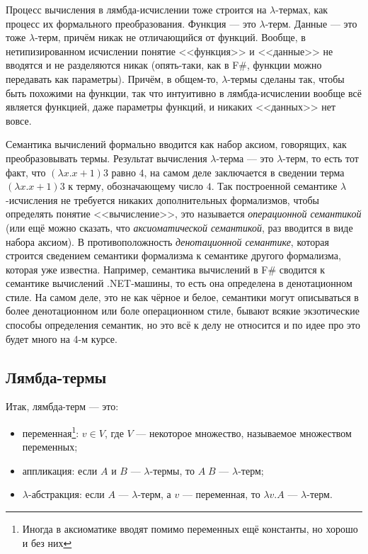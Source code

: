\documentclass{../../text-style}
\begin{document}
Процесс вычисления в лямбда-исчислении тоже строится на $\lambda$-термах, как процесс их формального преобразования. Функция --- это $\lambda$-терм. Данные --- это тоже $\lambda$-терм, причём никак не отличающийся от функций. Вообще, в нетипизированном исчислении понятие <<функция>> и <<данные>> не вводятся и не разделяются никак (опять-таки, как в F\#, функции можно передавать как параметры). Причём, в общем-то, $\lambda$-термы сделаны так, чтобы быть похожими на функции, так что интуитивно в лямбда-исчислении вообще всё является функцией, даже параметры функций, и никаких <<данных>> нет вовсе.

Семантика вычислений формально вводится как набор аксиом, говорящих, как преобразовывать термы. Результат вычисления $\lambda$-терма --- это $\lambda$-терм, то есть тот факт, что $(\lambda x.x + 1) 3$ равно $4$, на самом деле заключается в сведении терма $(\lambda x.x + 1) 3$ к терму, обозначающему число $4$. Так построенной семантике $\lambda$-исчисления не требуется никаких дополнительных формализмов, чтобы определять понятие <<вычисление>>, это называется \textit{операционной семантикой} (или ещё можно сказать, что \textit{аксиоматической семантикой}, раз вводится в виде набора аксиом). В противоположность \textit{денотационной семантике}, которая строится сведением семантики формализма к семантике другого формализма, которая уже известна. Например, семантика вычислений в F\# сводится к семантике вычислений .NET-машины, то есть она определена в денотационном стиле. На самом деле, это не как чёрное и белое, семантики могут описываться в более денотационном или боле операционном стиле, бывают всякие экзотические способы определения семантик, но это всё к делу не относится и по идее про это будет много на 4-м курсе.

\subsection{Лямбда-термы}

Итак, лямбда-терм --- это:

\begin{itemize}
    \item переменная\footnote{Иногда в аксиоматике вводят помимо переменных ещё константы, но хорошо и без них}: $v \in V$, где $V$ --- некоторое множество, называемое множеством переменных;
    \item аппликация: если $A$ и $B$ --- $\lambda$-термы, то $A \; B$ --- $\lambda$-терм;
    \item $\lambda$-абстракция: если $A$ --- $\lambda$-терм, а $v$ --- переменная, то $\lambda v. A$ --- $\lambda$-терм.
\end{itemize}
\end{document}
